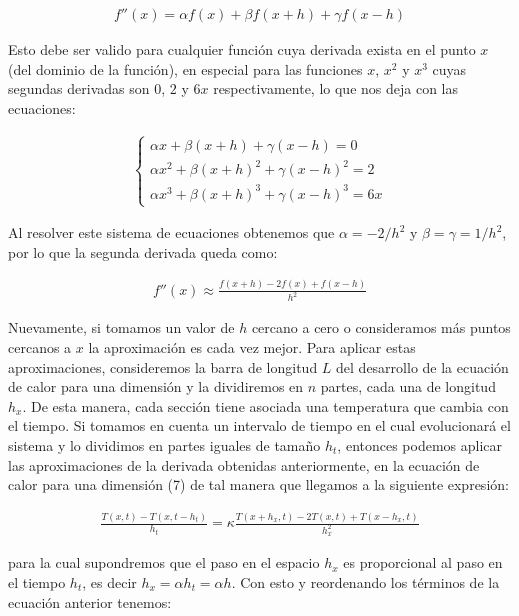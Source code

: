 \documentclass[12pt]{article}
\begin{document}
\begin{align*}
    f''(x) = \alpha f(x) + \beta f(x+h) + \gamma f(x-h)
\end{align*}

Esto debe ser valido para cualquier función cuya derivada exista en el punto $x$ (del dominio de la función), en especial para las funciones $x$, $x^2$ y $x^3$ cuyas segundas derivadas son $0$, $2$ y $6x$ respectivamente, lo que nos deja con las ecuaciones:

\begin{align}
    \begin{cases}
        \alpha x + \beta (x+h) + \gamma (x-h) = 0\\
        \alpha x^2 + \beta (x+h)^2 + \gamma (x-h)^2 = 2 \\
        \alpha x^3 + \beta (x+h)^3 + \gamma (x-h)^3 = 6x
    \end{cases}
\end{align}

Al resolver este sistema de ecuaciones obtenemos que $\alpha = -2/h^2$ y $\beta = \gamma = 1/h^2$, por lo que la segunda derivada queda como:

\begin{align*}
    f''(x) \approx \frac{f(x+h) - 2f(x) + f(x-h)}{h^2}
\end{align*}

Nuevamente, si tomamos un valor de $h$ cercano a cero o consideramos más puntos cercanos a $x$ la aproximación es cada vez mejor. Para aplicar estas aproximaciones, consideremos la barra de longitud $L$ del desarrollo de la ecuación de calor para una dimensión y la dividiremos en $n$ partes, cada una de longitud $h_x$. De esta manera, cada sección tiene asociada una temperatura que cambia con el tiempo. Si tomamos en cuenta un intervalo de tiempo en el cual evolucionará el sistema y lo dividimos en partes iguales de tamaño $h_t$, entonces podemos aplicar las aproximaciones de la derivada obtenidas anteriormente, en la ecuación de calor para una dimensión (7) de tal manera que llegamos a la siguiente expresión:

\begin{align*}
    \frac{T(x,t)-T(x,t-h_t)}{h_t} = \kappa \frac{T(x+h_x,t) - 2T(x,t) + T(x-h_x,t)}{h_x^2}
\end{align*}

para la cual supondremos que el paso en el espacio $h_x$ es proporcional al paso en el tiempo $h_t$, es decir $h_x = \alpha h_t = \alpha h$. Con esto y reordenando los términos de la ecuación anterior tenemos:
\end{document}
